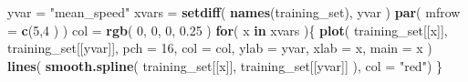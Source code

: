 \documentclass[]{article}
\newenvironment{Shaded}{\begin{snugshade}}{\end{snugshade}}
\newcommand{\ControlFlowTok}[1]{\textcolor[rgb]{0.13,0.29,0.53}{\textbf{#1}}}
\newcommand{\DataTypeTok}[1]{\textcolor[rgb]{0.13,0.29,0.53}{#1}}
\newcommand{\DecValTok}[1]{\textcolor[rgb]{0.00,0.00,0.81}{#1}}
\newcommand{\FloatTok}[1]{\textcolor[rgb]{0.00,0.00,0.81}{#1}}
\newcommand{\KeywordTok}[1]{\textcolor[rgb]{0.13,0.29,0.53}{\textbf{#1}}}
\newcommand{\NormalTok}[1]{#1}
\newcommand{\StringTok}[1]{\textcolor[rgb]{0.31,0.60,0.02}{#1}}
\begin{document}
\begin{Shaded}
\begin{Highlighting}[]
\NormalTok{yvar =}\StringTok{ "mean_speed"}
\NormalTok{xvars =}\StringTok{ }\KeywordTok{setdiff}\NormalTok{( }\KeywordTok{names}\NormalTok{(training_set), yvar )}
\KeywordTok{par}\NormalTok{( }\DataTypeTok{mfrow =} \KeywordTok{c}\NormalTok{(}\DecValTok{5}\NormalTok{,}\DecValTok{4}\NormalTok{ ) )}
\NormalTok{col  =}\StringTok{ }\KeywordTok{rgb}\NormalTok{( }\DecValTok{0}\NormalTok{, }\DecValTok{0}\NormalTok{, }\DecValTok{0}\NormalTok{, }\FloatTok{0.25}\NormalTok{ )}
\ControlFlowTok{for}\NormalTok{( x }\ControlFlowTok{in}\NormalTok{ xvars )\{}
    \KeywordTok{plot}\NormalTok{( training_set[[x]], training_set[[yvar]],}
        \DataTypeTok{pch =} \DecValTok{16}\NormalTok{, }\DataTypeTok{col =}\NormalTok{ col, }\DataTypeTok{ylab =}\NormalTok{ yvar,}
        \DataTypeTok{xlab =}\NormalTok{ x, }\DataTypeTok{main =}\NormalTok{ x )}
    \KeywordTok{lines}\NormalTok{( }\KeywordTok{smooth.spline}\NormalTok{( training_set[[x]], training_set[[yvar]] ),}
        \DataTypeTok{col =} \StringTok{"red"}\NormalTok{)}
\NormalTok{\}}


\end{Highlighting}
\end{Shaded}
\end{document}

